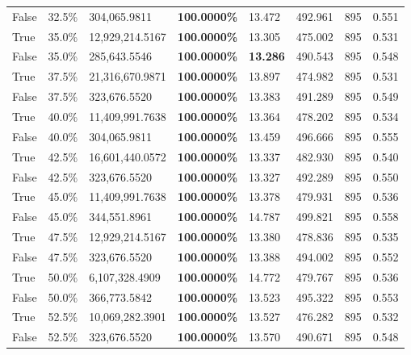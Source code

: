 \begin{table}[H]
\begin{tabular}{lllrllll}
\cline{1-8}
False & 32.5\% & 304,065.9811 & \bfseries \color{red} 100.0000\% & 13.472 & 492.961 & 895 & 0.551 \\
\cline{1-8}
True & 35.0\% & 12,929,214.5167 & \bfseries \color{red} 100.0000\% & 13.305 & 475.002 & 895 & 0.531 \\
\cline{1-8}
False & 35.0\% & \color{red} 285,643.5546 & \bfseries \color{red} 100.0000\% & \bfseries \color{red} 13.286 & 490.543 & 895 & 0.548 \\
\cline{1-8}
True & 37.5\% & 21,316,670.9871 & \bfseries \color{red} 100.0000\% & 13.897 & 474.982 & 895 & 0.531 \\
\cline{1-8}
False & 37.5\% & 323,676.5520 & \bfseries \color{red} 100.0000\% & 13.383 & 491.289 & 895 & 0.549 \\
\cline{1-8}
True & 40.0\% & 11,409,991.7638 & \bfseries \color{red} 100.0000\% & 13.364 & 478.202 & 895 & 0.534 \\
\cline{1-8}
False & 40.0\% & 304,065.9811 & \bfseries \color{red} 100.0000\% & 13.459 & 496.666 & 895 & 0.555 \\
\cline{1-8}
True & 42.5\% & 16,601,440.0572 & \bfseries \color{red} 100.0000\% & 13.337 & 482.930 & 895 & 0.540 \\
\cline{1-8}
False & 42.5\% & 323,676.5520 & \bfseries \color{red} 100.0000\% & 13.327 & 492.289 & 895 & 0.550 \\
\cline{1-8}
True & 45.0\% & 11,409,991.7638 & \bfseries \color{red} 100.0000\% & 13.378 & 479.931 & 895 & 0.536 \\
\cline{1-8}
False & 45.0\% & 344,551.8961 & \bfseries \color{red} 100.0000\% & 14.787 & 499.821 & 895 & 0.558 \\
\cline{1-8}
True & 47.5\% & 12,929,214.5167 & \bfseries \color{red} 100.0000\% & 13.380 & 478.836 & 895 & 0.535 \\
\cline{1-8}
False & 47.5\% & 323,676.5520 & \bfseries \color{red} 100.0000\% & 13.388 & 494.002 & 895 & 0.552 \\
\cline{1-8}
True & 50.0\% & 6,107,328.4909 & \bfseries \color{red} 100.0000\% & 14.772 & 479.767 & 895 & 0.536 \\
\cline{1-8}
False & 50.0\% & 366,773.5842 & \bfseries \color{red} 100.0000\% & 13.523 & 495.322 & 895 & 0.553 \\
\cline{1-8}
True & 52.5\% & 10,069,282.3901 & \bfseries \color{red} 100.0000\% & 13.527 & 476.282 & 895 & 0.532 \\
\cline{1-8}
False & 52.5\% & 323,676.5520 & \bfseries \color{red} 100.0000\% & 13.570 & 490.671 & 895 & 0.548 \\

\end{tabular}
\end{table}
